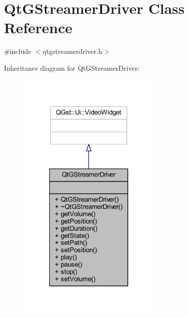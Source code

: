 \hypertarget{class_qt_g_streamer_driver}{\section{Qt\-G\-Streamer\-Driver Class Reference}
\label{class_qt_g_streamer_driver}
}


{\ttfamily \#include $<$qtgstreamerdriver.\-h$>$}



Inheritance diagram for Qt\-G\-Streamer\-Driver\-:
\nopagebreak
\begin{figure}[H]
\begin{center}
\leavevmode
\includegraphics[width=198pt]{class_qt_g_streamer_driver__inherit__graph}
\end{center}
\end{figure}


